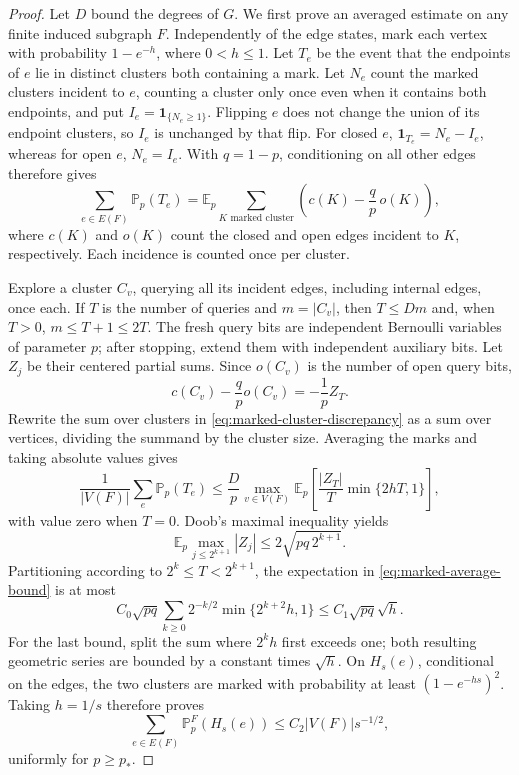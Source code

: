 \documentclass[11pt]{article}
\theoremstyle{definition}
\newcommand{\PP}{\mathbb P}
\newcommand{\EE}{\mathbb E}
\begin{document}
\begin{proof}
Let $D$ bound the degrees of $G$. We first prove an averaged estimate
on any finite induced subgraph $F$. Independently of the edge states,
mark each vertex with probability $1-e^{-h}$, where $0<h\le1$.
Let $T_e$ be the event that the endpoints of $e$ lie in distinct clusters
both containing a mark. Let $N_e$ count the marked clusters incident
to $e$, counting a cluster only once even when it contains both endpoints,
and put $I_e=\mathbf1_{\{N_e\ge1\}}$. Flipping $e$ does not change the
union of its endpoint clusters, so $I_e$ is unchanged by that flip.
For closed $e$, $\mathbf1_{T_e}=N_e-I_e$, whereas for open $e$,
$N_e=I_e$. With $q=1-p$, conditioning on all other edges therefore gives
\begin{equation}\label{eq:marked-cluster-discrepancy}
 \sum_{e\in E(F)}\PP_p(T_e)
 =\EE_p\sum_{K\text{ marked cluster}}
 \left(c(K)-\frac qp\,o(K)\right),
\end{equation}
where $c(K)$ and $o(K)$ count the closed and open edges incident to $K$,
respectively. Each incidence is counted once per cluster.

Explore a cluster $C_v$, querying all its incident edges, including
internal edges, once each. If $T$ is the number of queries and
$m=|C_v|$, then $T\le Dm$ and, when $T>0$, $m\le T+1\le2T$.
The fresh query bits are independent Bernoulli variables of parameter
$p$; after stopping, extend them with independent auxiliary bits.
Let $Z_j$ be their centered partial sums. Since
$o(C_v)$ is the number of open query bits,
\[
 c(C_v)-\frac qp o(C_v)=-\frac1p Z_T.
\]
Rewrite the sum over clusters in
\eqref{eq:marked-cluster-discrepancy} as a sum over vertices, dividing
the summand by the cluster size. Averaging the marks and taking absolute
values gives
\begin{equation}\label{eq:marked-average-bound}
 \frac1{|V(F)|}\sum_e\PP_p(T_e)
 \le\frac Dp\max_{v\in V(F)}
 \EE_p\left[\frac{|Z_T|}{T}\min\{2hT,1\}\right],
\end{equation}
with value zero when $T=0$.
Doob's maximal inequality yields
\[
 \EE_p\max_{j\le 2^{k+1}}|Z_j|
 \le2\sqrt{pq\,2^{k+1}}.
\]
Partitioning according to $2^k\le T<2^{k+1}$, the expectation in
\eqref{eq:marked-average-bound} is at most
\[
 C_0\sqrt{pq}\sum_{k\ge0}2^{-k/2}
                       \min\{2^{k+2}h,1\}
 \le C_1\sqrt{pq}\sqrt h.
\]
For the last bound, split the sum where $2^kh$ first exceeds one;
both resulting geometric series are bounded by a constant times
$\sqrt h$. On $H_s(e)$, conditional on the edges, the two clusters
are marked with probability at least $(1-e^{-hs})^2$. Taking $h=1/s$
therefore proves
\begin{equation}\label{eq:finite-two-cluster-average}
 \sum_{e\in E(F)}\PP_p^F(H_s(e))
 \le C_2|V(F)|s^{-1/2},
\end{equation}
uniformly for $p\ge p_*$.


\end{proof}
\end{document}
